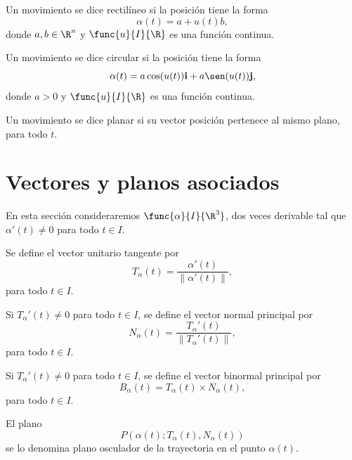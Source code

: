 \documentclass[a4,11pt]{aleph-notas}
\begin{document}
\begin{defi}
    Un movimiento se dice rectilíneo si la posición tiene la forma
    \[
        \alpha(t)=a+u(t) b,
    \]
    donde $a,b\in\R^n$ y $\func{u}{I}{\R}$ es una función continua.
\end{defi}

\begin{defi}
    Un movimiento se dice circular si la posición tiene la forma
    \[
        \alpha(t)=a\cos(u(t))\mathbf{i}+a\sen(u(t))\mathbf{j},
    \]
    donde $a>0$ y $\func{u}{I}{\R}$ es una función continua.
\end{defi}

\begin{defi}
    Un movimiento se dice planar si su vector posición pertenece al mismo plano, para todo $t$.
\end{defi}

\section{Vectores y planos asociados}

En esta sección consideraremos $\func{\alpha}{I}{\R^3}$, dos veces derivable tal que $\alpha'(t)\neq 0$ para todo $t\in I$.

\begin{defi}
    Se define el vector unitario tangente por
    \[
        T_\alpha(t)=\frac{\alpha'(t)}{\|\alpha'(t)\|},
    \]
    para todo $t\in I$.
\end{defi}

\begin{defi}
    Si $T_\alpha'(t)\neq 0$ para todo $t\in I$, se define el vector normal principal por
    \[
        N_\alpha(t)=\frac{T_\alpha'(t)}{\|T_\alpha'(t)\|},
    \]
    para todo $t\in I$.
\end{defi}

\begin{defi}
    Si $T_\alpha'(t)\neq 0$ para todo $t\in I$, se define el vector binormal principal por
    \[
        B_\alpha(t)=T_\alpha(t)\times N_\alpha(t),
    \]
    para todo $t\in I$.
\end{defi}

\begin{defi}
    El plano
    \[
        P(\alpha(t);T_\alpha(t),N_\alpha(t))
    \]
    se lo denomina plano osculador de la trayectoria en el punto $\alpha(t)$.
\end{defi}
\end{document}
